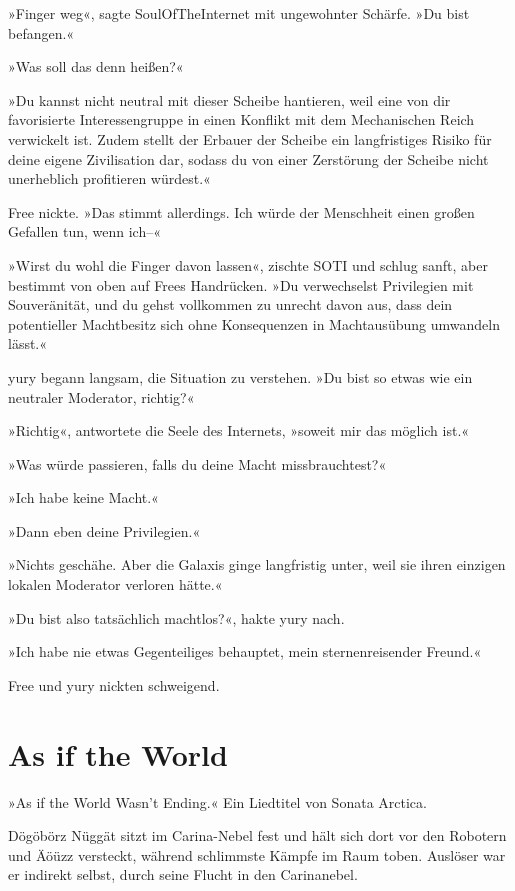 »Finger weg«, sagte SoulOfTheInternet mit ungewohnter Schärfe. »Du bist befangen.«

»Was soll das denn heißen?«

»Du kannst nicht neutral mit dieser Scheibe hantieren, weil eine von dir favorisierte Interessengruppe in einen Konflikt mit dem Mechanischen Reich verwickelt ist. Zudem stellt der Erbauer der Scheibe ein langfristiges Risiko für deine eigene Zivilisation dar, sodass du von einer Zerstörung der Scheibe nicht unerheblich profitieren würdest.«

Free nickte. »Das stimmt allerdings. Ich würde der Menschheit einen großen Gefallen tun, wenn ich–«

»Wirst du wohl die Finger davon lassen«, zischte SOTI und schlug sanft, aber bestimmt von oben auf Frees Handrücken. »Du verwechselst Privilegien mit Souveränität, und du gehst vollkommen zu unrecht davon aus, dass dein potentieller Machtbesitz sich ohne Konsequenzen in Machtausübung umwandeln lässt.«

yury begann langsam, die Situation zu verstehen. »Du bist so etwas wie ein neutraler Moderator, richtig?«

»Richtig«, antwortete die Seele des Internets, »soweit mir das möglich ist.«

»Was würde passieren, falls du deine Macht missbrauchtest?«

»Ich habe keine Macht.«

»Dann eben deine Privilegien.«

»Nichts geschähe. Aber die Galaxis ginge langfristig unter, weil sie ihren einzigen lokalen Moderator verloren hätte.«

»Du bist also tatsächlich machtlos?«, hakte yury nach.

»Ich habe nie etwas Gegenteiliges behauptet, mein sternenreisender Freund.«

Free und yury nickten schweigend.


\section{As if the World}

»As if the World Wasn't Ending.« Ein Liedtitel von Sonata Arctica.

Dögöbörz Nüggät sitzt im Carina-Nebel fest und hält sich dort vor den Robotern und Äöüzz versteckt, während schlimmste Kämpfe im Raum toben. Auslöser war er indirekt selbst, durch seine Flucht in den Carinanebel.

